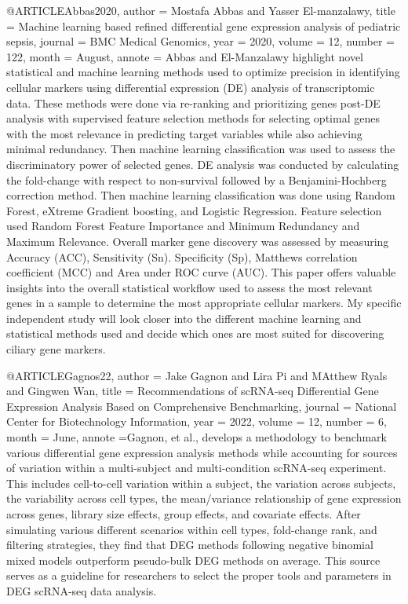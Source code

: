 @ARTICLE{Abbas2020,
  author    = {Mostafa Abbas and Yasser El-manzalawy},
  title     = {Machine learning based refined differential gene expression analysis of pediatric sepsis},
  journal   = {BMC Medical Genomics},
  year      = {2020},
  volume    = {12},
  number    = {122},
  month     = {August},
  annote    = {Abbas and El-Manzalawy highlight novel statistical and machine learning methods used to optimize precision in identifying cellular markers using differential expression (DE) analysis of transcriptomic data. These methods were done via re-ranking and prioritizing genes post-DE analysis with supervised feature selection methods for selecting optimal genes with the most relevance in predicting target variables while also achieving minimal redundancy. Then machine learning classification was used to assess the discriminatory power of selected genes. DE analysis was conducted by calculating the fold-change with respect to non-survival followed by a Benjamini-Hochberg correction method. Then machine learning classification was done using Random Forest, eXtreme Gradient boosting, and Logistic Regression. Feature selection used Random Forest Feature Importance and Minimum Redundancy and Maximum Relevance. Overall marker gene discovery was assessed by measuring Accuracy (ACC), Sensitivity (Sn). Specificity (Sp), Matthews correlation coefficient (MCC) and Area under ROC curve (AUC). This paper offers valuable insights into the overall statistical workflow used to assess the most relevant genes in a sample to determine the most appropriate cellular markers. My specific independent study will look closer into the different machine learning and statistical methods used and decide which ones are most suited for discovering ciliary gene markers. 
}
}

@ARTICLE{Gagnos22,
  author    = {Jake Gagnon and Lira Pi and MAtthew Ryals and Gingwen Wan},
  title     = {Recommendations of scRNA-seq Differential Gene Expression Analysis Based on Comprehensive Benchmarking},
  journal   = {National Center for Biotechnology Information},
  year      = {2022},
  volume    = {12},
  number    = {6},
  month     = {June},
  annote    ={Gagnon, et al., develops a methodology to benchmark various differential gene expression analysis methods while accounting for sources of variation within a multi-subject and multi-condition scRNA-seq experiment. This includes cell-to-cell variation within a subject, the variation across subjects, the variability across cell types, the mean/variance relationship of gene expression across genes, library size effects, group effects, and covariate effects. After simulating various different scenarios within cell types, fold-change rank, and filtering strategies, they find that DEG methods following negative binomial mixed models outperform pseudo-bulk DEG methods on average. This source serves as a guideline for researchers to select the proper tools and parameters in DEG scRNA-seq data analysis. }
  }

